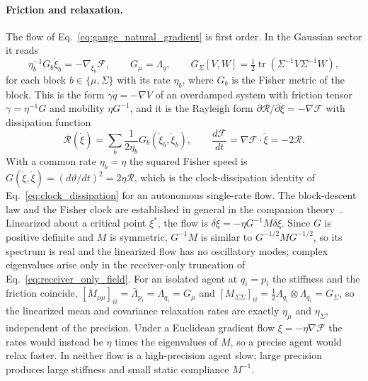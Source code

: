 \documentclass[11pt]{article}
\begin{document}
\paragraph{Friction and relaxation.} The flow of Eq.~\eqref{eq:gauge_natural_gradient} is first order. In the Gaussian sector it reads
\begin{equation}
\eta_b^{-1}G_b\dot{\xi}_b = -\nabla_{\xi_b}\mathcal{F},
\qquad
G_\mu = \Lambda_q,
\qquad
G_\Sigma[V, W] = \tfrac12\operatorname{tr}(\Sigma^{-1}V\Sigma^{-1}W),
\label{eq:friction_form}
\end{equation}
for each block $b \in \{\mu, \Sigma\}$ with its rate $\eta_b$, where $G_b$ is the Fisher metric of the block. This is the form $\gamma\dot{q} = -\nabla V$ of an overdamped system with friction tensor $\gamma = \eta^{-1}G$ and mobility $\eta G^{-1}$, and it is the Rayleigh form $\partial\mathcal{R}/\partial\dot{\xi} = -\nabla\mathcal{F}$ with dissipation function
\begin{equation}
\mathcal{R}(\dot{\xi}) = \sum_b \frac{1}{2\eta_b}G_b(\dot{\xi}_b, \dot{\xi}_b),
\qquad
\frac{d\mathcal{F}}{dt} = \nabla\mathcal{F}\cdot\dot{\xi} = -2\mathcal{R}.
\label{eq:rayleigh_dissipation}
\end{equation}
With a common rate $\eta_b = \eta$ the squared Fisher speed is $G(\dot{\xi}, \dot{\xi}) = (d\vartheta/dt)^2 = 2\eta\mathcal{R}$, which is the clock-dissipation identity of Eq.~\eqref{eq:clock_dissipation} for an autonomous single-rate flow. The block-descent law and the Fisher clock are established in general in the companion theory~\cite[Chs.~7 and 8]{DennisGaugeVFE2026}. Linearized about a critical point $\xi^*$, the flow is $\delta\dot{\xi} = -\eta G^{-1}M\delta\xi$. Since $G$ is positive definite and $M$ is symmetric, $G^{-1}M$ is similar to $G^{-1/2}MG^{-1/2}$, so its spectrum is real and the linearized flow has no oscillatory modes; complex eigenvalues arise only in the receiver-only truncation of Eq.~\eqref{eq:receiver_only_field}. For an isolated agent at $q_i = p_i$ the stiffness and the friction coincide, $[M_{\mu\mu}]_{ii} = \bar{\Lambda}_{p_i} = \Lambda_{q_i} = G_\mu$ and $[M_{\Sigma\Sigma}]_{ii} = \tfrac12\Lambda_{q_i}\otimes\Lambda_{q_i} = G_\Sigma$, so the linearized mean and covariance relaxation rates are exactly $\eta_\mu$ and $\eta_\Sigma$, independent of the precision. Under a Euclidean gradient flow $\dot{\xi} = -\eta\nabla\mathcal{F}$ the rates would instead be $\eta$ times the eigenvalues of $M$, so a precise agent would relax faster. In neither flow is a high-precision agent slow; large precision produces large stiffness and small static compliance $M^{-1}$.
\end{document}
